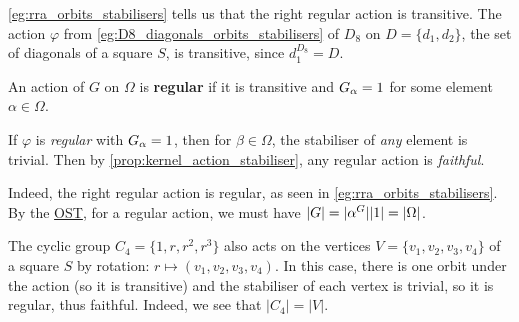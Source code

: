 \autoref{eg:rra_orbits_stabilisers} tells us that the right regular action is transitive. The action $\varphi$ from \autoref{eg:D8_diagonals_orbits_stabilisers} of $D_8$ on $D = \{d_1,d_2\}$, the set of diagonals of a square $S$, is transitive, since $d_1^{D_8} = D$.



\begin{definition}\label{def:regular_action}
    An action of $G$ on $\Omega$ is \textbf{regular} if it is transitive and $\added{2}{G_\alpha} = 1$ for some element $\alpha \in \Omega$.
\end{definition}

If $\varphi$ is \textit{regular} with $\added{2}{G_\alpha} = 1$, then for $\beta \in \Omega$,  the stabiliser of \textit{any} element is trivial. Then by \autoref{prop:kernel_action_stabiliser}, any regular action is \textit{faithful}. 

Indeed, the right regular action is regular, as seen in \autoref{eg:rra_orbits_stabilisers}. By the \hyperref[thm:orbit_stabiliser]{OST}, for a regular action, we must have $|G| = \added{1}{|\alpha^G||1|} = |\Omega|$.

\begin{example}\label{eg:action_C4_on_square}
    The cyclic group $C_4 = \{1,r,r^2,r^3\}$ also acts on the vertices $V = \{v_1,v_2,v_3,v_4\}$ of a square $S$  by rotation: $r \mapsto (v_1,v_2,v_3,v_4)$. In this case, there is one orbit under the action (so it is transitive) and the stabiliser of each vertex is trivial, so it is regular, thus faithful. Indeed, we see that $|C_4| = |V|$.
\end{example}

